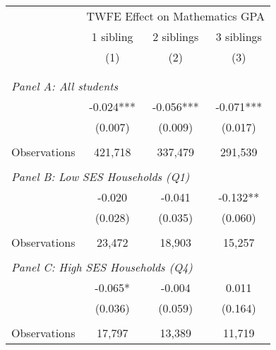 \makeatletter
{}
{
\makeatother
\begin{tabular}{lccc}
\toprule
\cmidrule(lr){2-4}
& \multicolumn{3}{c}{TWFE Effect on Mathematics GPA} \\
\cmidrule(lr){2-4}
& 1 sibling & 2 siblings & 3 siblings  \\
\cmidrule(lr){2-2} \cmidrule(lr){3-3} \cmidrule(lr){4-4}
& (1) & (2) & (3)\\
\bottomrule
&  &  &  \\
&  &  &   \\
\multicolumn{4}{l}{\textit{Panel A: All students}} \\
\hspace{3mm}        &      -0.024***&      -0.056***&      -0.071***\\
                    &     (0.007)   &     (0.009)   &     (0.017)   \\
                    &               &               &               \\
\hspace{3mm}Observations&     421,718   &     337,479   &     291,539   \\
 
&  &  &   \\
\multicolumn{4}{l}{\textit{Panel B: Low SES Households (Q1)}} \\
\hspace{3mm}        &      -0.020   &      -0.041   &      -0.132** \\
                    &     (0.028)   &     (0.035)   &     (0.060)   \\
                    &               &               &               \\
\hspace{3mm}Observations&      23,472   &      18,903   &      15,257   \\
 
&  &  &   \\
\multicolumn{4}{l}{\textit{Panel C: High SES Households (Q4)}} \\
\hspace{3mm}        &      -0.065*  &      -0.004   &       0.011   \\
                    &     (0.036)   &     (0.059)   &     (0.164)   \\
                    &               &               &               \\
\hspace{3mm}Observations&      17,797   &      13,389   &      11,719   \\
 

\end{tabular}}
